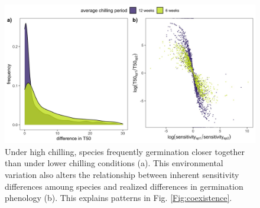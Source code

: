 \documentclass{article}[12pt]
\begin{document}
\begin{figure}[h!]
  \centering
 \includegraphics[width=\textwidth]{..//plots/coexistance_chilldiffs.jpeg}
    \caption{Under high chilling, species frequently germination closer together  than under lower chilling conditions (a). This environmental variation also alters the relationship between inherent sensitivity differences amoung species and realized differences in germination phenology (b). This explains patterns in Fig. \ref{Fig:coexistence}.}
    \label{Fig:differences}
\end{figure}
\end{document}

